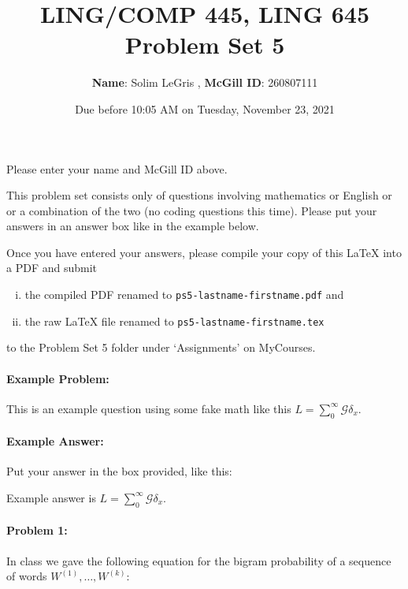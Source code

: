 \documentclass[10pt]{article}
\author{ 
  \textbf{Name}: Solim LeGris     %
, \textbf{McGill ID}: 260807111   %
}
\newenvironment{AnswerBox}{\begin{mdframed}[style=simple]}{\end{mdframed}}
\newcommand{\PSnum}{5}
\begin{document}
\title{LING/COMP 445, LING 645\\Problem Set \PSnum}
\date{Due before 10:05 AM on Tuesday, November 23, 2021}
\maketitle
Please enter your name and McGill ID above.

This problem set consists only of questions involving mathematics or
English or or a combination of the two (no coding questions this time).
Please put your answers in an answer box like in the example below.

Once you have entered your answers, please compile your copy of this
\LaTeX{} into a PDF and submit 
\begin{enumerate}[(i),noitemsep]
\item
the compiled PDF renamed to
\texttt{ps\PSnum-lastname-firstname.pdf} and
\item
the raw \LaTeX{} file renamed to
\texttt{ps\PSnum-lastname-firstname.tex}
\end{enumerate}
to the Problem Set \PSnum{} folder under `Assignments' on MyCourses.


\hrulefill %

\paragraph{Example Problem:}
This is an example question using some fake math like this
$L=\sum_0^{\infty} \mathcal{G} \delta_x$.

\paragraph{Example Answer:} Put your answer in the box provided, like this:
\begin{AnswerBox}
Example answer is $L=\sum_0^{\infty} \mathcal{G} \delta_x$.
\end{AnswerBox}


\hrulefill%

\pagebreak%

\hrulefill %

\paragraph{Problem 1:}
 
In class we gave the following equation for the bigram probability of
a sequence of words $W^{(1)},\dots,W^{(k)}$:
\end{document}
